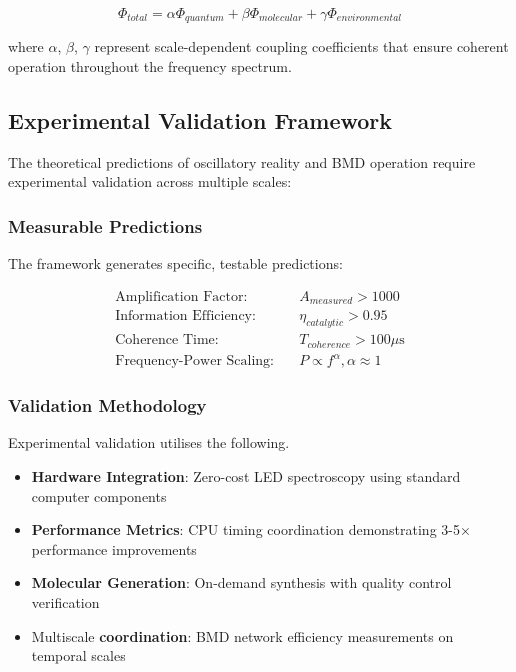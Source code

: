 \documentclass[12pt,a4paper]{article}
\begin{document}
\begin{equation}
\Phi_{total} = \alpha \Phi_{quantum} + \beta \Phi_{molecular} + \gamma \Phi_{environmental}
\end{equation}

where $\alpha$, $\beta$, $\gamma$ represent scale-dependent coupling coefficients that ensure coherent operation throughout the frequency spectrum.

\subsection{Experimental Validation Framework}

The theoretical predictions of oscillatory reality and BMD operation require experimental validation across multiple scales:

\subsubsection{Measurable Predictions}

The framework generates specific, testable predictions:

\begin{align}
\text{Amplification Factor}: \quad &A_{measured} > 1000 \\
\text{Information Efficiency}: \quad &\eta_{catalytic} > 0.95 \\
\text{Coherence Time}: \quad &T_{coherence} > 100 \mu\text{s} \\
\text{Frequency-Power Scaling}: \quad &P \propto f^{\alpha}, \alpha \approx 1
\end{align}

\subsubsection{Validation Methodology}

Experimental validation utilises the following.
\begin{itemize}
\item \textbf{Hardware Integration}: Zero-cost LED spectroscopy using standard computer components
\item \textbf{Performance Metrics}: CPU timing coordination demonstrating 3-5× performance improvements
\item \textbf{Molecular Generation}: On-demand synthesis with quality control verification 
\item Multiscale \textbf{coordination}: BMD network efficiency measurements on temporal scales \cite{vedral2011living}
\end{itemize}
\end{document}
